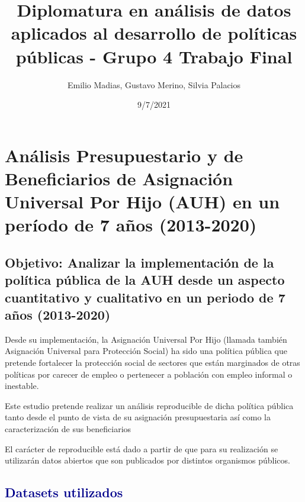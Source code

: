 \documentclass[
  12,
]{article}
\title{Diplomatura en análisis de datos aplicados al desarrollo de políticas
públicas - Grupo 4 Trabajo Final}
\author{Emilio Madias, Gustavo Merino, Silvia Palacios}
\date{9/7/2021}
\begin{document}
\maketitle

\hypertarget{anuxe1lisis-presupuestario-y-de-beneficiarios-de-asignaciuxf3n-universal-por-hijo-auh-en-un-peruxedodo-de-7-auxf1os-2013-2020}{%
\section{Análisis Presupuestario y de Beneficiarios de Asignación
Universal Por Hijo (AUH) en un período de 7 años
(2013-2020)}\label{anuxe1lisis-presupuestario-y-de-beneficiarios-de-asignaciuxf3n-universal-por-hijo-auh-en-un-peruxedodo-de-7-auxf1os-2013-2020}}

\hypertarget{objetivo-analizar-la-implementaciuxf3n-de-la-poluxedtica-puxfablica-de-la-auh-desde-un-aspecto-cuantitativo-y-cualitativo-en-un-periodo-de-7-auxf1os-2013-2020}{%
\subsection{Objetivo: Analizar la implementación de la política pública
de la AUH desde un aspecto cuantitativo y cualitativo en un periodo de 7
años
(2013-2020)}\label{objetivo-analizar-la-implementaciuxf3n-de-la-poluxedtica-puxfablica-de-la-auh-desde-un-aspecto-cuantitativo-y-cualitativo-en-un-periodo-de-7-auxf1os-2013-2020}}

Desde su implementación, la Asignación Universal Por Hijo (llamada
también Asignación Universal para Protección Social) ha sido una
política pública que pretende fortalecer la protección social de
sectores que están marginados de otras políticas por carecer de empleo o
pertenecer a población con empleo informal o inestable.

Este estudio pretende realizar un análisis reproducible de dicha
política pública tanto desde el punto de vista de su asignación
presupuestaria así como la caracterización de sus beneficiarios

El carácter de reproducible está dado a partir de que para su
realización se utilizarán datos abiertos que son publicados por
distintos organismos públicos.

\hypertarget{datasets-utilizados}{%
\subsection{\texorpdfstring{\textcolor{darkblue}{Datasets
utilizados}}{Datasets utilizados}}\label{datasets-utilizados}}
\end{document}
